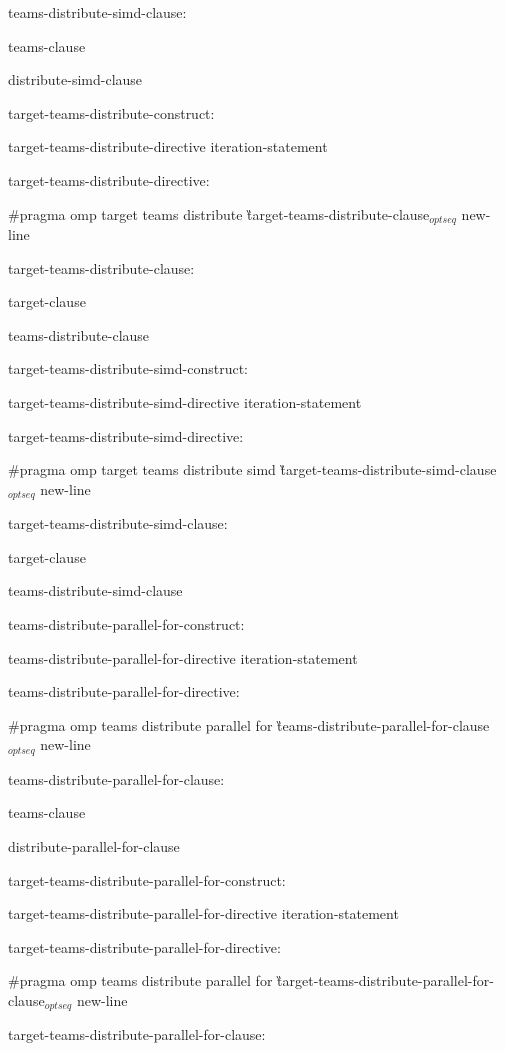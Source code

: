 {\I teams-distribute-simd-clause:

\I\I teams-clause

\I\I distribute-simd-clause

\I target-teams-distribute-construct:

\I\I target-teams-distribute-directive iteration-statement

\I target-teams-distribute-directive:

\C\I\I \#pragma omp target teams distribute \G target-teams-distribute-clause$_{optseq}$ new-line

\I target-teams-distribute-clause:

\I\I target-clause

\I\I teams-distribute-clause

\I target-teams-distribute-simd-construct:

\I\I target-teams-distribute-simd-directive iteration-statement

\I target-teams-distribute-simd-directive:

\C \I\I \#pragma omp target teams distribute simd \G target-teams-distribute-simd-clause$_{optseq}$ new-line

\I target-teams-distribute-simd-clause:

\I\I target-clause

\I\I teams-distribute-simd-clause

\I teams-distribute-parallel-for-construct:

\I\I teams-distribute-parallel-for-directive iteration-statement

\I teams-distribute-parallel-for-directive:

\C\I\I \#pragma omp teams distribute parallel for \G teams-distribute-parallel-for-clause$_{optseq}$ new-line

\I teams-distribute-parallel-for-clause:

\I\I teams-clause

\I\I distribute-parallel-for-clause

\I target-teams-distribute-parallel-for-construct:

\I\I target-teams-distribute-parallel-for-directive iteration-statement

\I target-teams-distribute-parallel-for-directive:

\C\I\I \#pragma omp teams distribute parallel for \G target-teams-distribute-parallel-for-clause$_{optseq}$ new-line

\I target-teams-distribute-parallel-for-clause:

}
